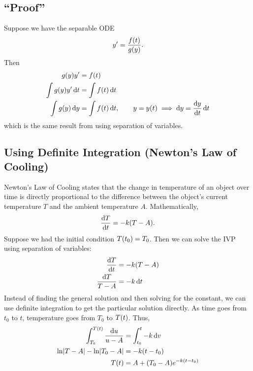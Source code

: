 \subsection{``Proof''}
Suppose we have the separable ODE \[ y' = \frac{f\p{t}}{g\p{y}}. \] Then
\normalskip
\begin{align*}
	g\p{y} y' &= f\p{t} \\
	\int g\p{y} y' \, \diff{t} &= \int f\p{t} \, \diff{t} \\
	\int g\p{y} \, \diff{y} &= \int f\p{t} \, \diff{t}, \qquad y = y\p{t} \implies \diff{y} = \frac{\diff{y}}{\diff{t}} \, \diff{t}
\end{align*}
which is the same result from using separation of variables.

\subsection{Using Definite Integration (Newton's Law of Cooling)}
Newton's Law of Cooling states that the change in temperature of an object over time is directly proportional to the difference between the object's current temperature $T$ and the ambient temperature $A$. Mathematically, \[ \frac{\diff{T}}{\diff{t}} = -k\p{T - A}. \] Suppose we had the initial condition $T\p{t_0} = T_0$. Then we can solve the IVP using separation of variables:
\begin{align*}
	\frac{\diff{T}}{\diff{t}} &= -k\p{T - A} \\
	\frac{\diff{T}}{T - A} &= -k \, \diff{t}
\end{align*}
Instead of finding the general solution and then solving for the constant, we can use definite integration to get the particular solution directly. As time goes from $t_0$ to $t$, temperature goes from $T_0$ to $T\p{t}$. Thus,
\begin{align*}
	\int_{T_0}^{T\p{t} }\frac{\diff{u}}{u - A} &= \int_{t_0}^{t} -k \, \diff{v} \\
	\ln\abs{T - A} - \ln\abs{T_0 - A} &= -k\p{t - t_0} \\
	T\p{t} &= A + \p{T_0 - A}e^{-k\p{t - t_0}}
\end{align*}

